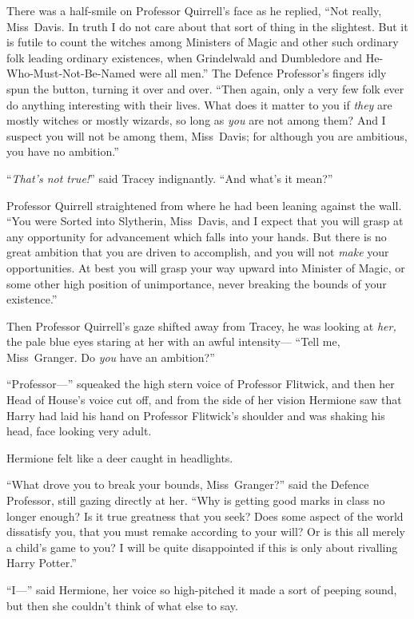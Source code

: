 There was a half-smile on Professor Quirrell’s face as he replied, “Not really, Miss~Davis. In truth I do not care about that sort of thing in the slightest. But it is futile to count the witches among Ministers of Magic and other such ordinary folk leading ordinary existences, when Grindelwald and Dumbledore and He-Who-Must-Not-Be-Named were all men.” The Defence Professor’s fingers idly spun the button, turning it over and over. “Then again, only a very few folk ever do anything interesting with their lives. What does it matter to you if \emph{they} are mostly witches or mostly wizards, so long as \emph{you} are not among them? And I suspect you will not be among them, Miss~Davis; for although you are ambitious, you have no ambition.”

“\emph{That’s not true!}” said Tracey indignantly. “And what’s it mean?”

Professor Quirrell straightened from where he had been leaning against the wall. “You were Sorted into Slytherin, Miss~Davis, and I expect that you will grasp at any opportunity for advancement which falls into your hands. But there is no great ambition that you are driven to accomplish, and you will not \emph{make} your opportunities. At best you will grasp your way upward into Minister of Magic, or some other high position of unimportance, never breaking the bounds of your existence.”

Then Professor Quirrell’s gaze shifted away from Tracey, he was looking at \emph{her,} the pale blue eyes staring at her with an awful intensity— “Tell me, Miss~Granger. Do \emph{you} have an ambition?”

“Professor—” squeaked the high stern voice of Professor Flitwick, and then her Head of House’s voice cut off, and from the side of her vision Hermione saw that Harry had laid his hand on Professor Flitwick’s shoulder and was shaking his head, face looking very adult.

Hermione felt like a deer caught in headlights.

“What drove you to break your bounds, Miss~Granger?” said the Defence Professor, still gazing directly at her. “Why is getting good marks in class no longer enough? Is it true greatness that you seek? Does some aspect of the world dissatisfy you, that you must remake according to your will? Or is this all merely a child’s game to you? I will be quite disappointed if this is only about rivalling Harry Potter.”

“I—” said Hermione, her voice so high-pitched it made a sort of peeping sound, but then she couldn’t think of what else to say.

